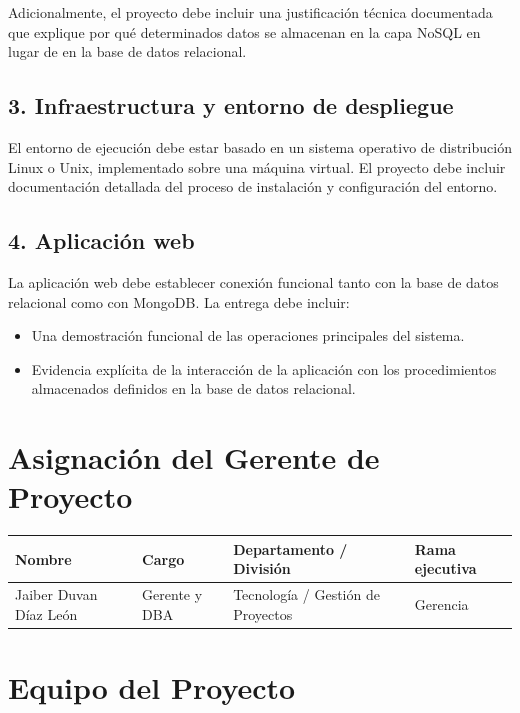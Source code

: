 \documentclass[12pt, a4paper]{article}
\begin{document}
Adicionalmente, el proyecto debe incluir una justificación técnica documentada que explique por qué determinados datos se almacenan en la capa NoSQL en lugar de en la base de datos relacional.

\subsection*{3. Infraestructura y entorno de despliegue}

El entorno de ejecución debe estar basado en un sistema operativo de distribución Linux o Unix, implementado sobre una máquina virtual. El proyecto debe incluir documentación detallada del proceso de instalación y configuración del entorno.

\subsection*{4. Aplicación web}

La aplicación web debe establecer conexión funcional tanto con la base de datos relacional como con MongoDB. La entrega debe incluir:

\begin{itemize}[leftmargin=2cm]
    \item Una demostración funcional de las operaciones principales del sistema.
    \item Evidencia explícita de la interacción de la aplicación con los procedimientos almacenados definidos en la base de datos relacional.
\end{itemize}

\section{Asignación del Gerente de Proyecto}
 
\begin{tabularx}{\textwidth}{@{} X l X l @{}}
    \toprule
    \textbf{Nombre} & \textbf{Cargo} & \textbf{Departamento / División} & \textbf{Rama ejecutiva} \\
    \midrule
    Jaiber Duvan Díaz León & Gerente y DBA & Tecnología / Gestión de Proyectos & Gerencia \\
    \bottomrule
\end{tabularx}
 
\section{Equipo del Proyecto}
 
\end{document}
